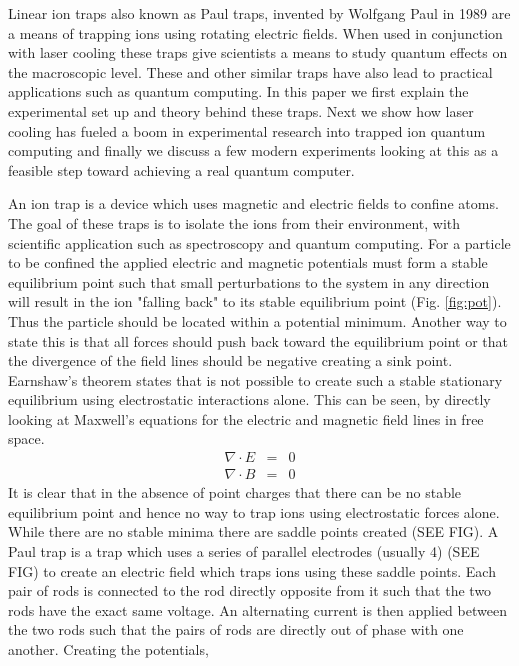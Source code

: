 \documentclass[aps,prb,twocolumn,superscriptaddress]{revtex4-1}
\begin{document}
Linear ion traps also known as Paul traps, invented by Wolfgang Paul in 1989 are a means of trapping ions using rotating electric fields.  When used in conjunction with laser cooling these traps give scientists a means to study quantum effects on the macroscopic level. These and other similar traps have also lead to practical applications such as quantum computing. In this paper we first explain the experimental set up and theory behind these traps.  Next we show how laser cooling has fueled a boom in experimental research into trapped ion quantum computing and finally we discuss a few modern experiments looking at this as a feasible step toward achieving a real quantum computer.

An ion trap is a device which uses magnetic and electric fields to confine atoms. The goal of these traps is to isolate the ions from their environment, with scientific application such as spectroscopy and  quantum computing. For a particle to be confined the applied electric and magnetic potentials must form a stable equilibrium point such that small perturbations to the system in any direction will result in the ion "falling back" to its stable equilibrium point (Fig. \ref{fig:pot}). Thus the particle should be located within a potential minimum. Another way to state this is that all forces should push back toward the equilibrium point or that the divergence of the field lines should be negative creating a sink point.
Earnshaw's theorem states that is not possible to create such a stable stationary equilibrium using electrostatic interactions alone. This can be seen, by directly looking at Maxwell's equations for the electric and magnetic field lines in free space.
\begin{eqnarray}
\nabla\cdot E &=& 0\\
\nabla\cdot B &=& 0
\label{chiB}
\end{eqnarray}
It is clear that in the absence of point charges that there can be no stable equilibrium point and hence no way to trap ions using electrostatic forces alone. While there are no stable minima there are saddle points created (SEE FIG). A Paul trap is a trap which uses a series of parallel electrodes (usually 4) (SEE FIG) to create an electric field which traps ions using these saddle points. Each pair of rods is connected to the rod directly opposite from it such that the two rods have the exact same voltage. An alternating current is then applied between the two rods such that the pairs of rods are directly out of phase with one another. Creating the potentials,
\end{document}
